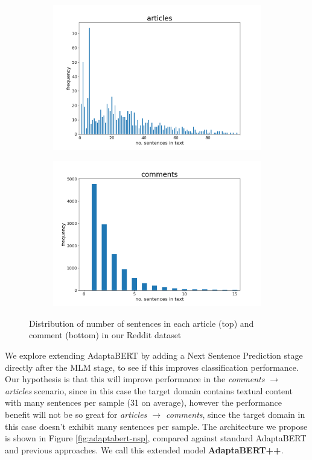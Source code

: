 \begin{figure}[ht]
    \centering
    \begin{subfigure}{\textwidth}
        \centering
        \includegraphics[scale=0.45]{0-img/num-sentences-distribution-articles.png}
    \end{subfigure}
    \begin{subfigure}{\textwidth}
        \centering
        \includegraphics[scale=0.45]{0-img/num-sentences-distribution-comments.png}
    \end{subfigure}
    \caption{Distribution of number of sentences in each article (top) and comment (bottom) in our Reddit dataset}
    \label{fig:num-sentences-distributions}
\end{figure}

We explore extending AdaptaBERT by adding a Next Sentence Prediction stage directly after the MLM stage, to see if this improves classification performance. Our hypothesis is that this will improve performance in the \textit{comments $ \rightarrow $ articles} scenario, since in this case the target domain contains textual content with many sentences per sample (31 on average), however the performance benefit will not be so great for \textit{articles $ \rightarrow $ comments}, since the target domain in this case doesn't exhibit many sentences per sample. The architecture we propose is shown in Figure \ref{fig:adaptabert-nsp}, compared against standard AdaptaBERT and previous approaches. We call this extended model \textbf{AdaptaBERT++}.

